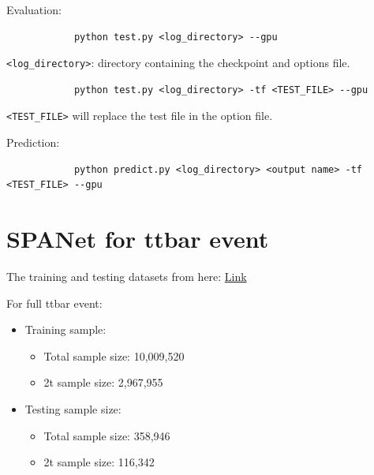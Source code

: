 \documentclass[12pt]{article}
\begin{document}
		Evaluation:
		\begin{verbatim}
			python test.py <log_directory> --gpu
		\end{verbatim}
		\verb+<log_directory>+: directory containing the checkpoint and options file.
		\begin{verbatim}
			python test.py <log_directory> -tf <TEST_FILE> --gpu
		\end{verbatim}
		\verb+<TEST_FILE>+ will replace the test file in the option file.

		Prediction:
		\begin{verbatim}
			python predict.py <log_directory> <output name> -tf <TEST_FILE> --gpu
		\end{verbatim}

\section{SPANet for ttbar event}%
\label{sec:spanet_for_ttbar_event}
	The training and testing datasets from here: \href{http://mlphysics.ics.uci.edu/data/2021_ttbar/}{Link}

	For full ttbar event:
	\begin{itemize}
		\item Training sample:
		\begin{itemize}
			\item Total sample size: 10,009,520
			\item 2t sample size: 2,967,955
		\end{itemize}
		\item Testing sample size: 
			\begin{itemize}
				\item Total sample size: 358,946
				\item 2t sample size: 116,342
			\end{itemize}
	\end{itemize}
\end{document}
